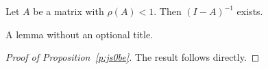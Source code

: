 \begin{theorem}\label{t:nsl}
Let $A$ be a matrix with $\rho(A) < 1$. Then $(I - A)^{-1}$ exists.
\end{theorem}

\begin{lemma}\label{t:plain}
A lemma without an optional title.
\end{lemma}

\begin{proof}[Proof of Proposition~\ref{p:js0be}]
The result follows directly.
\end{proof}
